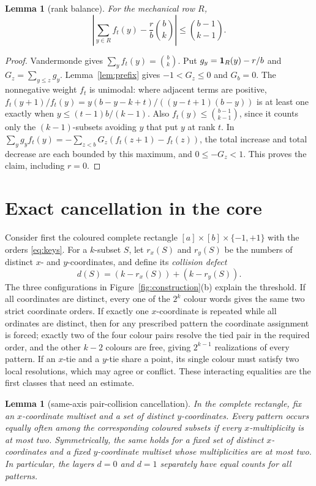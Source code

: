 \documentclass[11pt,letterpaper]{article}
\newtheorem{lemma}[theorem]{Lemma}
\begin{document}
\begin{lemma}[rank balance]\label{lem:rank-balance}
For the mechanical row $R$,
\begin{equation}\label{eq:rank-balance}
 \left|\sum_{y\in R} f_t(y)-\frac rb\binom bk\right|
 \leq\binom{b-1}{k-1}.
\end{equation}
\end{lemma}
\begin{proof}
Vandermonde gives $\sum_y f_t(y)=\binom bk$.
Put $g_y={\bf1}_R(y)-r/b$ and $G_z=\sum_{y\le z}g_y$.
Lemma~\ref{lem:prefix} gives $-1<G_z\le0$ and $G_b=0$.
The nonnegative weight $f_t$ is unimodal: where adjacent terms are positive,
$f_t(y+1)/f_t(y)=y(b-y-k+t)/((y-t+1)(b-y))$ is at least one exactly when
$y\le(t-1)b/(k-1)$. Also $f_t(y)\le\binom{b-1}{k-1}$, since it counts
only the $(k-1)$-subsets avoiding $y$ that put $y$ at rank $t$.
In $\sum_y g_yf_t(y)=-\sum_{z<b}G_z(f_t(z+1)-f_t(z))$,
the total increase and total decrease are each bounded by this
maximum, and $0\le-G_z<1$. This proves the claim, including $r=0$.
\end{proof}

\section{Exact cancellation in the core}

Consider first the coloured complete rectangle
$[a]\times[b]\times\{-1,+1\}$ with the orders
\eqref{eq:keys}.  For a $k$-subset $S$, let $r_x(S)$ and $r_y(S)$ be
the numbers of distinct $x$- and $y$-coordinates, and define its
\emph{collision defect}
\[
 d(S)=(k-r_x(S))+(k-r_y(S)).
\]
The three configurations in Figure~\ref{fig:construction}(b) explain the
threshold.  If all coordinates are distinct, every one of the $2^k$ colour
words gives the same two strict coordinate orders.  If exactly one
$x$-coordinate is repeated while all ordinates are distinct, then for any
prescribed pattern the coordinate assignment is forced; exactly two of the
four colour pairs resolve the tied pair in the required order, and the other
$k-2$ colours are free, giving $2^{k-1}$ realizations of every pattern.  If an
$x$-tie and a $y$-tie share a point, its single colour must satisfy two local
resolutions, which may agree or conflict.  These interacting equalities are
the first classes that need an estimate.

\begin{lemma}[same-axis pair-collision cancellation]
\label{lem:core-uniform}
In the complete rectangle, fix an $x$-coordinate multiset and a set of
distinct $y$-coordinates.  Every pattern occurs equally often among the
corresponding coloured subsets if every $x$-multiplicity is at most two.
Symmetrically, the same holds
for a fixed set of distinct $x$-coordinates and a fixed $y$-coordinate
multiset whose multiplicities are at most two.  In particular, the
layers $d=0$ and $d=1$ separately have equal counts for all patterns.
\end{lemma}
\end{document}
